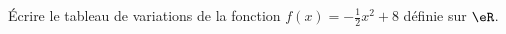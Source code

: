 
\begin{exercice}\label{exosmath-0656}

    Écrire le tableau de variations de la fonction \( f(x)=-\frac{ 1 }{2}x^2+8\) définie sur \( \eR\).

\end{exercice}
